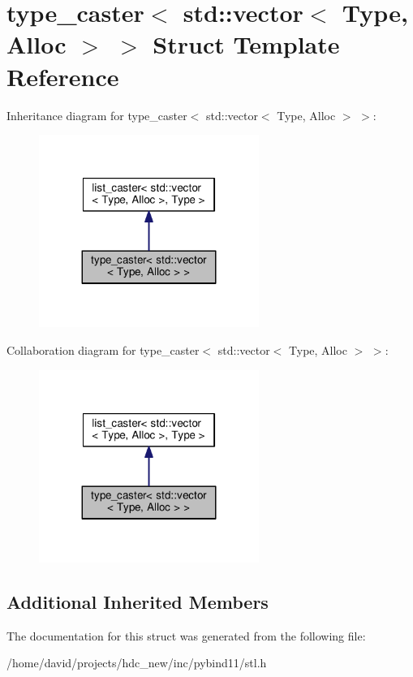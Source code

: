 \hypertarget{structtype__caster_3_01std_1_1vector_3_01_type_00_01_alloc_01_4_01_4}{}\section{type\+\_\+caster$<$ std\+:\+:vector$<$ Type, Alloc $>$ $>$ Struct Template Reference}
\label{structtype__caster_3_01std_1_1vector_3_01_type_00_01_alloc_01_4_01_4}


Inheritance diagram for type\+\_\+caster$<$ std\+:\+:vector$<$ Type, Alloc $>$ $>$\+:
\nopagebreak
\begin{figure}[H]
\begin{center}
\leavevmode
\includegraphics[width=203pt]{structtype__caster_3_01std_1_1vector_3_01_type_00_01_alloc_01_4_01_4__inherit__graph}
\end{center}
\end{figure}


Collaboration diagram for type\+\_\+caster$<$ std\+:\+:vector$<$ Type, Alloc $>$ $>$\+:
\nopagebreak
\begin{figure}[H]
\begin{center}
\leavevmode
\includegraphics[width=203pt]{structtype__caster_3_01std_1_1vector_3_01_type_00_01_alloc_01_4_01_4__coll__graph}
\end{center}
\end{figure}
\subsection*{Additional Inherited Members}


The documentation for this struct was generated from the following file\+:\begin{DoxyCompactItemize}
\item 
/home/david/projects/hdc\+\_\+new/inc/pybind11/stl.\+h\end{DoxyCompactItemize}
